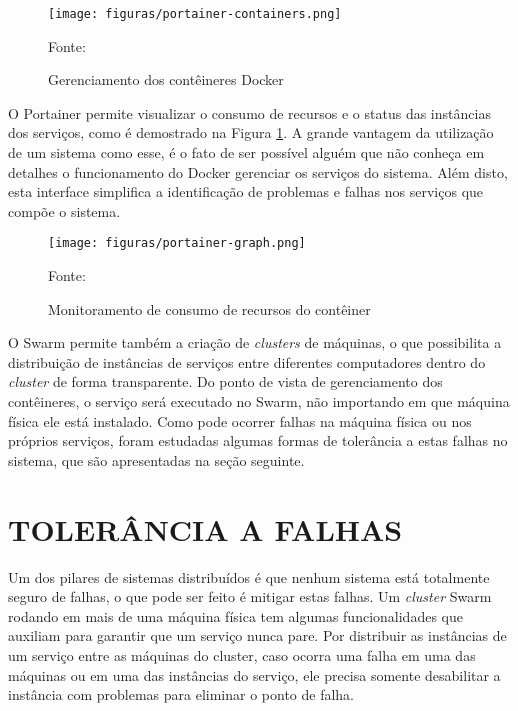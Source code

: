 \begin{figure}[H]
	\centering
	\caption{Gerenciamento dos contêineres Docker}
	\texttt{[image: figuras/portainer-containers.png]}

	\label{fig:portainer-containers}
	\footnotesize Fonte: \fonteOAutor
\end{figure}

O Portainer permite visualizar o consumo de recursos e o status das instâncias
dos serviços, como é demostrado na Figura \ref{fig:portainer-containers}.
A grande vantagem da utilização de um sistema como esse, é o fato de ser
possível alguém que não conheça em detalhes o funcionamento do Docker gerenciar
os serviços do sistema. Além disto, esta interface simplifica a identificação
de problemas e falhas nos serviços que compõe o sistema.

\begin{figure}[H]
	\centering
	\caption{Monitoramento de consumo de recursos do contêiner}
	\texttt{[image: figuras/portainer-graph.png]}

	\label{fig:portainer-graph}
	\footnotesize Fonte: \fonteOAutor
\end{figure}

O Swarm permite também a criação de \emph{clusters} de máquinas, o que
possibilita a distribuição de instâncias de serviços entre diferentes
computadores dentro do \emph{cluster} de forma transparente. Do ponto de
vista de gerenciamento dos contêineres, o serviço será executado no
Swarm, não importando em que máquina física ele está instalado. Como pode
ocorrer falhas na máquina física ou nos próprios serviços, foram estudadas
algumas formas de tolerância a estas falhas no sistema, que são apresentadas
na seção seguinte.

\section{TOLERÂNCIA A FALHAS}

Um dos pilares de sistemas distribuídos é que nenhum sistema está totalmente
seguro de falhas, o que pode ser feito é mitigar estas falhas. Um
\emph{cluster} Swarm rodando em mais de uma máquina física tem algumas
funcionalidades que auxiliam para garantir que um serviço nunca pare. Por
distribuir as instâncias de um serviço entre as máquinas do cluster, caso
ocorra uma falha em uma das máquinas ou em uma das instâncias do serviço, ele
precisa somente desabilitar a instância com problemas para eliminar o ponto de
falha.


